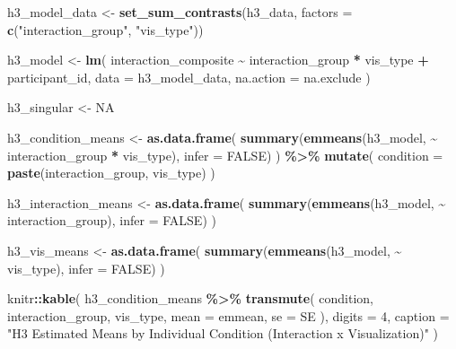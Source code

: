 \documentclass[
]{article}
\newenvironment{Shaded}{\begin{snugshade}}{\end{snugshade}}
\newcommand{\AttributeTok}[1]{\textcolor[rgb]{0.13,0.29,0.53}{#1}}
\newcommand{\ConstantTok}[1]{\textcolor[rgb]{0.56,0.35,0.01}{#1}}
\newcommand{\DecValTok}[1]{\textcolor[rgb]{0.00,0.00,0.81}{#1}}
\newcommand{\FunctionTok}[1]{\textcolor[rgb]{0.13,0.29,0.53}{\textbf{#1}}}
\newcommand{\NormalTok}[1]{#1}
\newcommand{\OtherTok}[1]{\textcolor[rgb]{0.56,0.35,0.01}{#1}}
\newcommand{\SpecialCharTok}[1]{\textcolor[rgb]{0.81,0.36,0.00}{\textbf{#1}}}
\newcommand{\StringTok}[1]{\textcolor[rgb]{0.31,0.60,0.02}{#1}}
\begin{document}
\begin{Shaded}
\begin{Highlighting}[]
\NormalTok{h3\_model\_data }\OtherTok{\textless{}{-}} \FunctionTok{set\_sum\_contrasts}\NormalTok{(h3\_data, }\AttributeTok{factors =} \FunctionTok{c}\NormalTok{(}\StringTok{"interaction\_group"}\NormalTok{, }\StringTok{"vis\_type"}\NormalTok{))}

\NormalTok{h3\_model }\OtherTok{\textless{}{-}} \FunctionTok{lm}\NormalTok{(}
\NormalTok{  interaction\_composite }\SpecialCharTok{\textasciitilde{}}\NormalTok{ interaction\_group }\SpecialCharTok{*}\NormalTok{ vis\_type }\SpecialCharTok{+}\NormalTok{ participant\_id,}
  \AttributeTok{data =}\NormalTok{ h3\_model\_data,}
  \AttributeTok{na.action =}\NormalTok{ na.exclude}
\NormalTok{)}

\NormalTok{h3\_singular }\OtherTok{\textless{}{-}} \ConstantTok{NA}

\NormalTok{h3\_condition\_means }\OtherTok{\textless{}{-}} \FunctionTok{as.data.frame}\NormalTok{(}
  \FunctionTok{summary}\NormalTok{(}\FunctionTok{emmeans}\NormalTok{(h3\_model, }\SpecialCharTok{\textasciitilde{}}\NormalTok{ interaction\_group }\SpecialCharTok{*}\NormalTok{ vis\_type), }\AttributeTok{infer =} \ConstantTok{FALSE}\NormalTok{)}
\NormalTok{) }\SpecialCharTok{\%\textgreater{}\%}
  \FunctionTok{mutate}\NormalTok{(}
    \AttributeTok{condition =} \FunctionTok{paste}\NormalTok{(interaction\_group, vis\_type)}
\NormalTok{  )}

\NormalTok{h3\_interaction\_means }\OtherTok{\textless{}{-}} \FunctionTok{as.data.frame}\NormalTok{(}
  \FunctionTok{summary}\NormalTok{(}\FunctionTok{emmeans}\NormalTok{(h3\_model, }\SpecialCharTok{\textasciitilde{}}\NormalTok{ interaction\_group), }\AttributeTok{infer =} \ConstantTok{FALSE}\NormalTok{)}
\NormalTok{)}

\NormalTok{h3\_vis\_means }\OtherTok{\textless{}{-}} \FunctionTok{as.data.frame}\NormalTok{(}
  \FunctionTok{summary}\NormalTok{(}\FunctionTok{emmeans}\NormalTok{(h3\_model, }\SpecialCharTok{\textasciitilde{}}\NormalTok{ vis\_type), }\AttributeTok{infer =} \ConstantTok{FALSE}\NormalTok{)}
\NormalTok{)}

\NormalTok{knitr}\SpecialCharTok{::}\FunctionTok{kable}\NormalTok{(}
\NormalTok{  h3\_condition\_means }\SpecialCharTok{\%\textgreater{}\%}
    \FunctionTok{transmute}\NormalTok{(}
\NormalTok{      condition,}
\NormalTok{      interaction\_group,}
\NormalTok{      vis\_type,}
      \AttributeTok{mean =}\NormalTok{ emmean,}
      \AttributeTok{se =}\NormalTok{ SE}
\NormalTok{    ),}
  \AttributeTok{digits =} \DecValTok{4}\NormalTok{,}
  \AttributeTok{caption =} \StringTok{"H3 Estimated Means by Individual Condition (Interaction x Visualization)"}
\NormalTok{)}
\end{Highlighting}
\end{Shaded}
\end{document}
